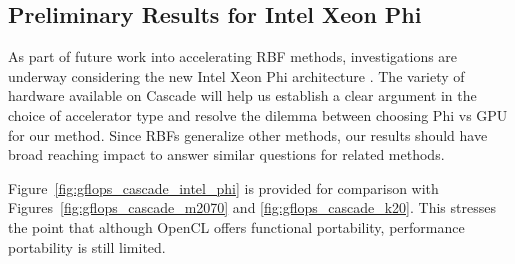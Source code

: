 \documentclass{report}
\begin{document}
\subsection{Preliminary Results for Intel Xeon Phi} 

As part of future work into accelerating RBF methods, investigations are underway considering the new Intel Xeon Phi architecture \cite{IntelXeonPhi2013}. The variety of hardware available on Cascade will help us establish a clear argument in the choice of accelerator type and resolve the dilemma between choosing Phi vs GPU for our method. Since RBFs generalize other methods, our results should have broad reaching impact to answer similar questions for related methods.

Figure~\ref{fig:gflops_cascade_intel_phi} is provided for comparison with Figures~\ref{fig:gflops_cascade_m2070} and \ref{fig:gflops_cascade_k20}. This stresses the point that although OpenCL offers functional portability, performance portability is still limited. 
\end{document}
